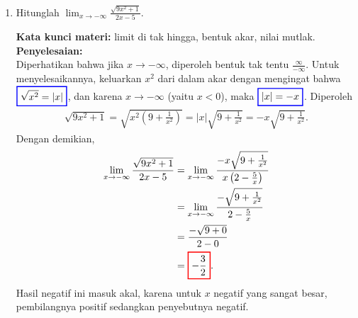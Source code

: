 \documentclass[10pt,openany,a4paper]{article}
\theoremstyle{definition}
\theoremstyle{definition}
\theoremstyle{plain}
\newenvironment{jawab}[2][tes]{%
\par\noindent\textbf{Kata kunci materi:} #1.\\
\textbf{Penyelesaian:} #2%
}{}
\begin{document}
\begin{enumerate}
    \item Hitunglah $\displaystyle\lim_{x\to-\infty}\frac{\sqrt{9x^2+1}}{2x-5}$.
    \begin{jawab}[limit di tak hingga, bentuk akar, nilai mutlak]{~\\
        Diperhatikan bahwa jika $x\to-\infty$, diperoleh bentuk tak tentu $\frac{\infty}{-\infty}$. Untuk menyelesaikannya, keluarkan $x^2$ dari dalam akar dengan mengingat bahwa $\colorlet{oldcolor}{.}
        \color{blue}
        \setlength{\fboxrule}{1pt} \boxed{\color{oldcolor}\sqrt{x^2}=|x|}\color{oldcolor}$, dan karena $x\to-\infty$ (yaitu $x<0$), maka $\colorlet{oldcolor}{.}
        \color{blue}
        \setlength{\fboxrule}{1pt} \boxed{\color{oldcolor}|x|=-x}\color{oldcolor}$. Diperoleh
        \begin{align*}
            \sqrt{9x^2+1} = \sqrt{x^2\left(9+\frac{1}{x^2}\right)} = |x|\sqrt{9+\frac{1}{x^2}} = -x\sqrt{9+\frac{1}{x^2}}.
        \end{align*}
        Dengan demikian,
        \begin{align*}
            \lim_{x\to-\infty}\frac{\sqrt{9x^2+1}}{2x-5} &= \lim_{x\to-\infty}\frac{-x\sqrt{9+\frac{1}{x^2}}}{x\left(2-\frac{5}{x}\right)}\\
            &= \lim_{x\to-\infty}\frac{-\sqrt{9+\frac{1}{x^2}}}{2-\frac{5}{x}}\\
            &= \frac{-\sqrt{9+0}}{2-0}\\
            &= \colorlet{oldcolor}{.}
        \color{red}
        \setlength{\fboxrule}{1pt} \boxed{\color{oldcolor}-\frac{3}{2}}\color{oldcolor}.
        \end{align*}
        Hasil negatif ini masuk akal, karena untuk $x$ negatif yang sangat besar, pembilangnya positif sedangkan penyebutnya negatif.
    }
    \end{jawab}


\end{enumerate}
\end{document}
